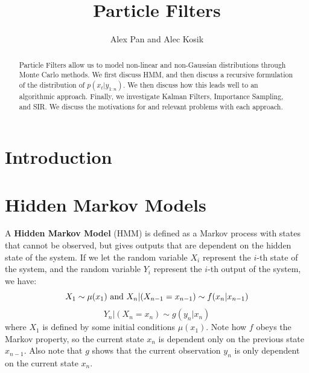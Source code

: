 \documentclass{article}
\title{\vspace{-2cm}Particle Filters} %
\author{Alex Pan and Alec Kosik}
\date{} %
\begin{document}
\maketitle

\begin{abstract}
Particle Filters allow us to model non-linear and non-Gaussian distributions through Monte Carlo methods. We first discuss HMM, and then discuss a recursive formulation of the distribution of $p(x_t|y_{1:n})$. We then discuss how this leads well to an algorithmic approach. Finally, we investigate Kalman Filters, Importance Sampling, and SIR. We discuss the motivations for and relevant problems with each approach.
\end{abstract}

\section{Introduction}

\section{Hidden Markov Models}

A \textbf{Hidden Markov Model} (HMM) is defined as a Markov process with states that cannot be observed, but gives outputs that are dependent on the hidden state of the system. If we let the random variable $X_i$ represent the $i$-th state of the system, and the random variable $Y_i$ represent the $i$-th output of the system, we have:
\begin{equation}
X_1 \sim \mu (x_1) \textnormal{ and } X_n|(X_{n-1}=x_{n-1}) \sim f(x_n|x_{n-1})
\end{equation}
\begin{equation}
Y_n|(X_n = x_n) \sim g(y_n|x_n)
\end{equation}
where $X_1$ is defined by some initial conditions $\mu(x_1)$. Note how $f$ obeys the Markov property, so the current state $x_n$ is dependent only on the previous state $x_{n-1}$. Also note that $g$ shows that the current observation $y_n$ is only dependent on the current state $x_n$.
\end{document}
